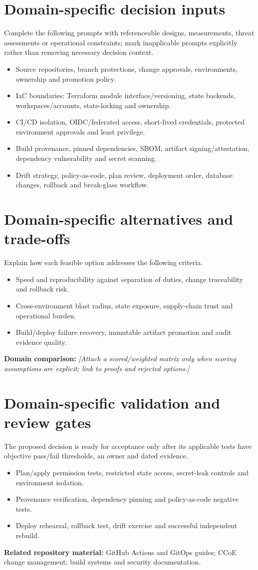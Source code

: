 \documentclass[11pt,letterpaper]{article}
\begin{document}
\section{Domain-specific decision inputs}
Complete the following prompts with referenceable designs, measurements,
threat assessments or operational constraints; mark inapplicable prompts
explicitly rather than removing necessary decision context.
\begin{itemize}
\item Source repositories, branch protections, change approvals, environments, ownership and promotion policy.
\item IaC boundaries: Terraform module interface/versioning, state backends, workspaces/accounts, state-locking and ownership.
\item CI/CD isolation, OIDC/federated access, short-lived credentials, protected environment approvals and least privilege.
\item Build provenance, pinned dependencies, SBOM, artifact signing/attestation, dependency vulnerability and secret scanning.
\item Drift strategy, policy-as-code, plan review, deployment order, database changes, rollback and break-glass workflow.
\end{itemize}
\section{Domain-specific alternatives and trade-offs}
Explain how each feasible option addresses the following criteria.
\begin{itemize}
\item Speed and reproducibility against separation of duties, change traceability and rollback risk.
\item Cross-environment blast radius, state exposure, supply-chain trust and operational burden.
\item Build/deploy failure recovery, immutable artifact promotion and audit evidence quality.
\end{itemize}
\noindent\textbf{Domain comparison:} \emph{[Attach a scored/weighted matrix only
when scoring assumptions are explicit; link to proofs and rejected options.]}
\section{Domain-specific validation and review gates}
The proposed decision is ready for acceptance only after its applicable
tests have objective pass/fail thresholds, an owner and dated evidence.
\begin{itemize}
\item Plan/apply permission tests, restricted state access, secret-leak controls and environment isolation.
\item Provenance verification, dependency pinning and policy-as-code negative tests.
\item Deploy rehearsal, rollback test, drift exercise and successful independent rebuild.
\end{itemize}
\noindent\textbf{Related repository material:} GitHub Actions and GitOps guides; CCoE change management; build systems and security documentation.
\end{document}
